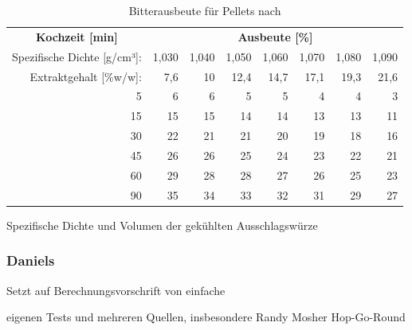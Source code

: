 \documentclass[a4paper,parskip=half]{scrartcl}
\begin{document}
\begin{table}[H]
\centering
\begin{tabular}{rrrrrrrr} 
\toprule
\multicolumn{1}{c}{\textbf{Kochzeit [min]}} & \multicolumn{7}{c}{\textbf{Ausbeute [\%]}}  \\
Spezifische Dichte [g/cm³]:                                        & 1,030 & 1,040 & 1,050 & 1,060 & 1,070 & 1,080  & 1,090                   \\
Extraktgehalt [\%w/w]:                                            & 7,6 & 10 & 12,4 & 14,7 & 17,1 & 19,3  & 21,6                   \\  
\midrule
5                                            & 6     & 6     & 5     & 5     & 4     & 4      & 3                          \\
15                                           & 15    & 15    & 14    & 14    & 13    & 13     & 11                         \\
30                                           & 22    & 21    & 21    & 20    & 19    & 18     & 16                         \\
45                                           & 26    & 26    & 25    & 24    & 23    & 22     & 21                         \\
60                                           & 29    & 28    & 28    & 27    & 26    & 25     & 23                         \\
90                                           & 35    & 34    & 33    & 32    & 31    & 29     & 27                         \\
\bottomrule
\end{tabular}
\caption{Bitterausbeute für Pellets nach \citeauthor{Mosher1994} \parencite[51]{Holle2010}}
\label{table:mosherutilpellets}
\end{table}

\parencite[53]{Holle2010}
Spezifische Dichte und Volumen der gekühlten Ausschlagswürze


                              

\subsubsection*{Daniels}

\parencite[80]{Daniels1996}
Setzt auf Berechnungsvorschrift von \citeauthor{Rager1990}
einfache

eigenen Tests und mehreren Quellen, insbesondere Randy Mosher
Hop-Go-Round
\end{document}

